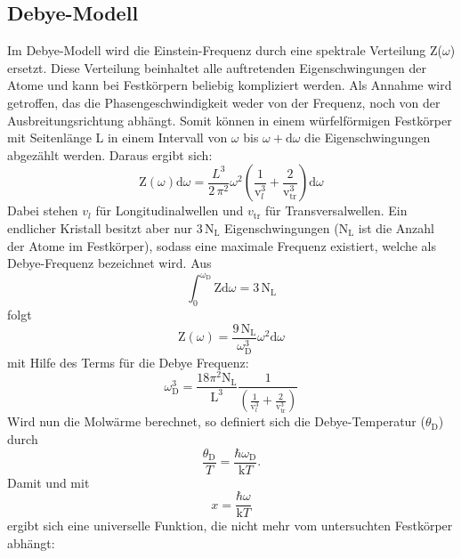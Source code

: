 \subsection{Debye-Modell}
\label{sec:Debye-Modell}
Im Debye-Modell wird die Einstein-Frequenz durch eine spektrale Verteilung Z($\omega$)
ersetzt. Diese Verteilung beinhaltet alle auftretenden Eigenschwingungen der Atome
und kann bei Festkörpern
beliebig kompliziert werden. Als Annahme wird getroffen, das die Phasengeschwindigkeit
weder von der Frequenz, noch von der Ausbreitungsrichtung abhängt. Somit können in
einem würfelförmigen Festkörper mit Seitenlänge L in einem Intervall von $\omega$ bis $\omega + \text{d}\omega$
die Eigenschwingungen abgezählt werden. Daraus ergibt sich:
\begin{equation}
  \text{Z}(\omega) \text{d}\omega = \frac{L^3}{2\,\pi^2}\omega^2\left(\frac{1}{\text{v}_l^3}+\frac{2}{\text{v}_\text{tr}^3}\right)\text{d}\omega
\end{equation}
Dabei stehen $v_l$ für Longitudinalwellen und $v_\text{tr}$ für Transversalwellen. Ein endlicher Kristall besitzt aber nur $3\,\text{N}_\text{L}$ Eigenschwingungen ($\text{N}_\text{L}$
ist die Anzahl der Atome im Festkörper), sodass eine maximale Frequenz existiert, welche als Debye-Frequenz bezeichnet wird. Aus
\begin{equation}
  \int_0^{\omega_\text{D}} \text{Z} \text{d}\omega = 3\,\text{N}_\text{L}
\end{equation}
folgt
\begin{equation}
  \text{Z}(\omega) = \frac{9\,\text{N}_\text{L}}{\omega_\text{D}^3}\omega^2 \text{d}\omega
\end{equation}
mit Hilfe des Terms für die Debye Frequenz:
\begin{equation}
  \omega_\text{D}^3 = \frac{18\pi^2\text{N}_\text{L}}{\text{L}^3}\frac{1}{\left(\frac{1}{\text{v}_l^3}+\frac{2}{\text{v}_\text{tr}^3}\right)}
  \label{eqn:debye-frequenz}
\end{equation}
Wird nun die Molwärme berechnet, so definiert sich die Debye-Temperatur ($\theta_\text{D}$) durch
\begin{equation}
  \frac{\theta_\text{D}}{T} = \frac{\hbar\omega_\text{D}}{\text{k}T}.
    \label{eqn:debye-temperatur}
\end{equation}
Damit und mit
\begin{equation}
  x = \frac{\hbar\omega}{\text{k}T}
\end{equation}
ergibt sich eine universelle Funktion, die nicht mehr vom untersuchten Festkörper abhängt:
